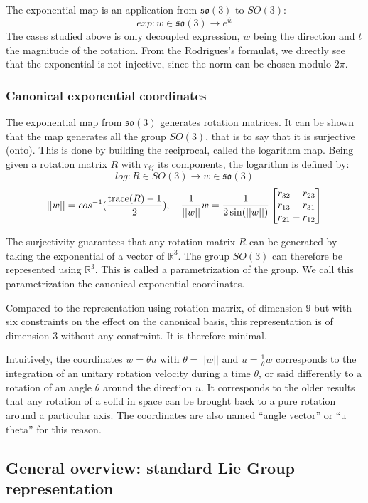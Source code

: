 \documentclass{book}
\begin{document}
The exponential map is an application from $\mathfrak{so}(3)$ to $SO(3)$:
\[ exp: w \in \mathfrak{so}(3) \rightarrow e^{\hat{w}} \]
The cases studied above is only decoupled expression, $w$ being the direction and $t$ the magnitude of the rotation. From the Rodrigues's formulat, we directly see that the exponential is not injective, since the norm can be chosen modulo $2\pi$.


\subsubsection{Canonical exponential coordinates}

The exponential map from $\mathfrak{so}(3)$ generates rotation matrices. It can be shown that the map generates all the group $SO(3)$, that is to say that it is surjective (onto). This is done by building the reciprocal, called the logarithm map. Being given a rotation matrix $R$ with $r_{ij}$ its components, the logarithm is defined by:
\[ log : R\in SO(3) \rightarrow w \in \mathfrak{so}(3) \]
\[ || w || = cos^{-1} ( \frac{\textrm{trace}(R) -1}{2}) , \quad \frac{1}{||w||} w = \frac{1}{2\sin(||w||)} \begin{bmatrix} r_{32}-r_{23} \\  r_{13}-r_{31} \\  r_{21}-r_{12} \end{bmatrix} \]

The surjectivity guarantees that any rotation matrix $R$ can be generated by taking the exponential of a vector of $\mathbb{R}^3$. The group $SO(3)$ can therefore be represented using $\mathbb{R}^3$. This is called a parametrization of the group. We call this parametrization the canonical exponential coordinates.

Compared to the representation using rotation matrix, of dimension $9$ but with six constraints on the effect on the canonical basis, this representation is of dimension 3 without any constraint. It is therefore minimal. 

Intuitively, the coordinates $w = \theta u$ with $\theta = || w ||$ and $u = \frac{1}{\theta} w$ corresponds to the integration of an unitary rotation velocity during a time $\theta$, or said differently to a rotation of an angle $\theta$ around the direction $u$. It corresponds to the older results that any rotation of a solid in space can be brought back to a pure rotation around a particular axis. The coordinates are also named ``angle vector'' or ``u theta'' for this reason.


\subsection{General overview: standard Lie Group representation}
\end{document}
